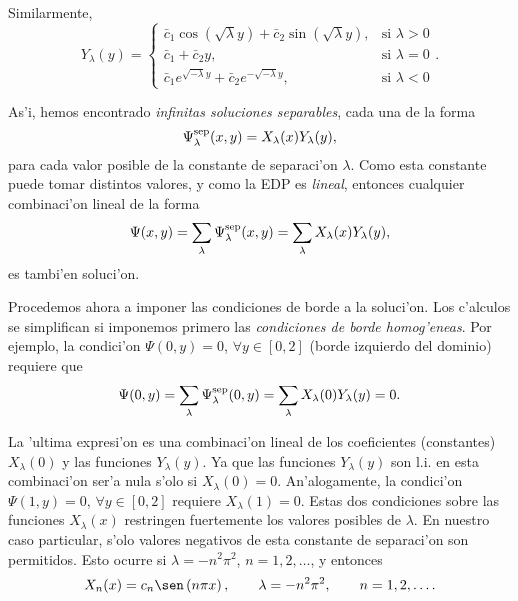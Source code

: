 Similarmente,
\begin{equation}
Y_\lambda(y)= 	\begin{cases}
		\bar{c}_1\cos(\sqrt{\lambda}y) + \bar{c}_2\sin(\sqrt{\lambda}y), & \text{si }\lambda>0 \\
		\bar{c}_1 + \bar{c}_2y,  & \text{si } \lambda=0 \\
		\bar{c}_1e^{\sqrt{-\lambda}y} + \bar{c}_2e^{-\sqrt{-\lambda}y}, & \text{si } \lambda<0
		\end{cases}.
\end{equation}

As'i, hemos encontrado \textit{infinitas soluciones separables}, cada una de la forma
\begin{equation}\label{EjLapPsiXY}
\Psi_\lambda^{\rm sep}(x,y)=X_\lambda(x)Y_\lambda(y),
\end{equation}
para cada valor posible de la constante de separaci'on $\lambda$. Como esta constante puede tomar distintos valores, y como la EDP es \textit{lineal}, entonces cualquier combinaci'on lineal de la forma
\begin{equation}\label{EjLapPsisumaSep}
\Psi(x,y) = \sum_{\lambda}\Psi_\lambda^{\rm sep}(x,y) = \sum_{\lambda}X_\lambda(x)Y_\lambda(y),
\end{equation}
es tambi'en soluci'on.

Procedemos ahora a imponer las condiciones de borde a la soluci'on. Los c'alculos se simplifican si imponemos primero las \textit{condiciones de borde homog'eneas}. Por ejemplo, la condici'on $\Psi(0,y)=0$, $\forall y\in[0,2]$ (borde izquierdo del dominio) requiere que
\begin{equation}
\Psi(0,y) = \sum_{\lambda}\Psi_\lambda^{\rm sep}(0,y) = \sum_{\lambda}X_\lambda(0)Y_\lambda(y) = 0.
\end{equation}

La 'ultima expresi'on es una combinaci'on lineal de los coeficientes (constantes) $X_\lambda(0)$ y las funciones $Y_\lambda(y)$. Ya que las funciones $Y_\lambda(y)$ son l.i. en esta combinaci'on ser'a nula s'olo si $X_\lambda(0)=0$. An'alogamente, la condici'on 
$\Psi(1,y)=0$, $\forall y\in[0,2]$ requiere $X_\lambda(1)=0$. Estas dos condiciones sobre las funciones $X_\lambda(x)$ restringen fuertemente los valores posibles de $\lambda$. En nuestro caso particular, s'olo valores negativos de esta constante de separaci'on son permitidos. Esto ocurre si $\lambda = -n^2\pi^2$, $n=1,2,\dots$, y entonces
\begin{equation}
X_n(x)=c_n\sen\left(n\pi x\right), \qquad \lambda = -n^2\pi^2, \qquad n=1,2,\dots.
\end{equation}


